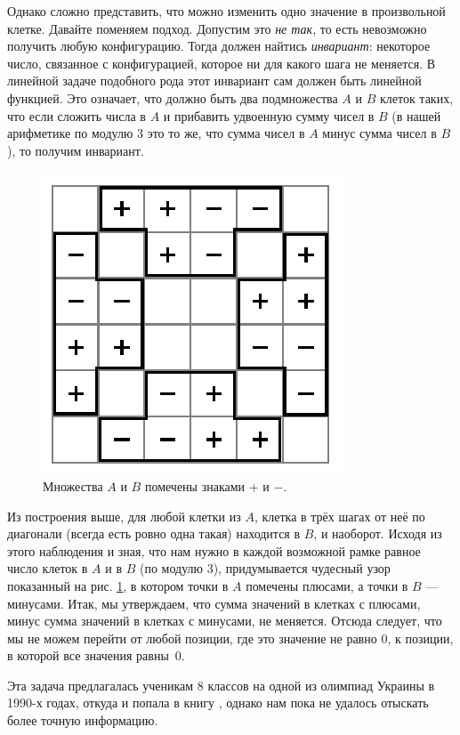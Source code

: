 Однако сложно представить, что можно изменить одно значение в произвольной клетке.
Давайте поменяем подход.
Допустим это \emph{не так}, то есть невозможно получить любую конфигурацию.
Тогда должен найтись \emph{инвариант}: некоторое число, связанное с конфигурацией, которое ни для какого шага не меняется.
В линейной задаче подобного рода этот инвариант сам должен быть линейной функцией.
Это означает, что должно быть два подмножества $A$ и $B$ клеток таких, что если сложить числа в $A$ и прибавить удвоенную сумму чисел в $B$ (в нашей арифметике по модулю $3$ это то же, что сумма чисел в $A$ минус сумма чисел в $B$), то получим инвариант.

\begin{figure}[t!]
\centering
\includegraphics[scale=1]{pics/chess2}
\caption{Множества $A$ и $B$ помечены знаками $+$ и $-$.}
\label{pic:chess2}
\end{figure}

Из построения выше, для любой клетки из $A$, клетка в трёх шагах от неё по диагонали (всегда есть ровно одна такая) находится в $B$, и наоборот.
Исходя из этого наблюдения и зная, что нам нужно в каждой возможной рамке равное число клеток в $A$ и в $B$ (по модулю 3), придумывается чудесный узор показанный на рис. \ref{pic:chess2}, в котором точки в $A$ помечены плюсами, а точки в $B$ --- минусами.
Итак, мы утверждаем, что сумма значений в клетках с плюсами, минус сумма значений в клетках с минусами, не меняется.
Отсюда следует, что мы не можем перейти от любой позиции, где это значение не равно $0$, к позиции, в которой все значения равны~$0$.

\begin{addedbytheeditors}
  Эта задача предлагалась ученикам 8 классов на одной из олимпиад Украины в 1990-х годах, откуда и попала в книгу \cite{markova}, однако нам пока не удалось отыскать более точную информацию.  
\end{addedbytheeditors}

